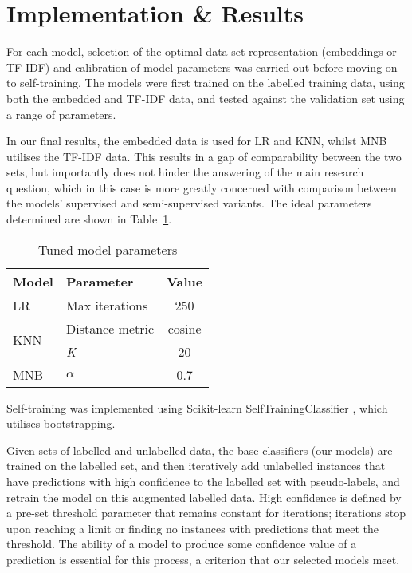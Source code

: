 \documentclass[11pt]{article}
\begin{document}
\section{Implementation \& Results}

For each model, selection of the optimal data set representation (embeddings or TF-IDF) and calibration of model parameters was carried out before moving on to self-training.
The models were first trained on the labelled training data, using both the embedded and TF-IDF data, and tested against the validation set using a range of parameters. 

In our final results, the embedded data is used for LR and KNN, whilst MNB utilises the TF-IDF data. 
This results in a gap of comparability between the two sets, but importantly does not hinder the 
answering of the main research question, which in this case is more greatly concerned with comparison between the models' supervised and semi-supervised variants.
The ideal parameters determined are shown in Table~\ref{table:params}.


\begin{table}[h]
 \begin{center}
\begin{tabular}{|l||l|c|}

      \hline
      \textbf{Model} & \textbf{Parameter} & \textbf{Value}\\
      \hline\hline
      LR & Max iterations & 250\\
	\hline
      \multirow{2}{4em}{KNN} & Distance metric & cosine\\
       & \textit{K} & 20\\
	\hline
      MNB & $\alpha$ & 0.7\\
      \hline

\end{tabular}
\caption{Tuned model parameters}
\label{table:params}
\end{center}
\end{table}

Self-training was implemented using Scikit-learn SelfTrainingClassifier \citep{sklearn}, which utilises bootstrapping.

Given sets of labelled and unlabelled data, the base classifiers (our models) are trained on the 
labelled set, and then iteratively add unlabelled instances that have predictions with 
high confidence to the labelled set with pseudo-labels, and retrain the model on 
this augmented labelled data. High confidence is defined by a pre-set threshold 
parameter that remains constant for iterations; iterations stop upon reaching a 
limit or finding no instances with predictions that meet the threshold. 
The ability of a model to produce some confidence value of a 
prediction is essential for this process, a criterion that our selected models meet.
\end{document}
